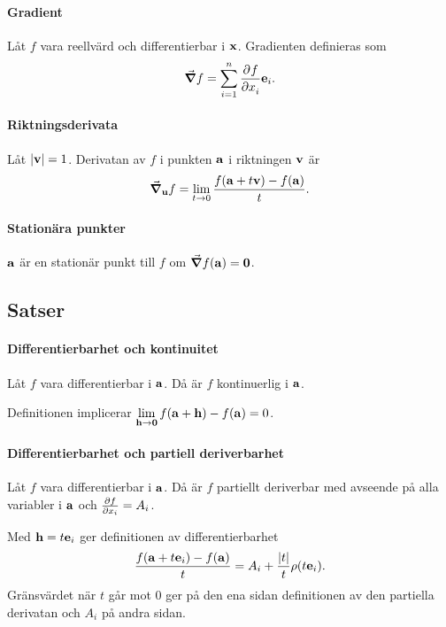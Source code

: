 \paragraph{Gradient}
Låt $f$ vara reellvärd och differentierbar i $\vect{x}$. Gradienten definieras som
\begin{align*}
	\grad{f} = \sum\limits_{i = 1}^{n}\pdeval{f}{x_i}{\vect{x}}\vect{e}_i.
\end{align*}

\paragraph{Riktningsderivata}
Låt $\abs{\vect{v}} = 1$. Derivatan av $f$ i punkten $\vect{a}$ i riktningen $\vect{v}$ är
\begin{align*}
	\grad_{\vect{u}}f = \limit{t}{0}\frac{f(\vect{a} + t\vect{v}) - f(\vect{a})}{t}.
\end{align*}

\paragraph{Stationära punkter}
$\vect{a}$ är en stationär punkt till $f$ om $\grad{f}(\vect{a}) = \vect{0}$.

\subsection{Satser}

\paragraph{Differentierbarhet och kontinuitet}
Låt $f$ vara differentierbar i $\vect{a}$. Då är $f$ kontinuerlig i $\vect{a}$.

\proof
Definitionen implicerar $\limit{\vect{h}}{\vect{0}}f(\vect{a} + \vect{h}) - f(\vect{a}) = 0$.

\paragraph{Differentierbarhet och partiell deriverbarhet}
Låt $f$ vara differentierbar i $\vect{a}$. Då är $f$ partiellt deriverbar med avseende på alla variabler i $\vect{a}$ och $\pdv{f}{x_i}(\vect{a}) = A_i$.

\proof
Med $\vect{h} = t\vect{e}_i$ ger definitionen av differentierbarhet
\begin{align*}
	\frac{f(\vect{a} + t\vect{e}_i) - f(\vect{a})}{t} = A_i + \frac{\abs{t}}{t}\rho(t\vect{e}_i).
\end{align*}
Gränsvärdet när $t$ går mot $0$ ger på den ena sidan definitionen av den partiella derivatan och $A_i$ på andra sidan.

